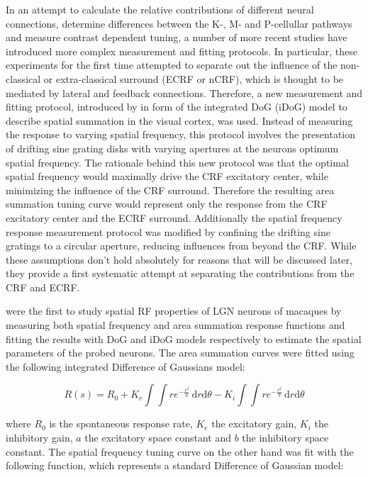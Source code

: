 In an attempt to calculate the relative contributions of different
neural connections, determine differences between the K-, M- and
P-cellullar pathways and measure contrast dependent tuning, a number
of more recent studies have introduced more complex measurement and
fitting protocols. In particular, these experiments for the first time
attempted to separate out the influence of the non-classical or
extra-classical surround (ECRF or nCRF), which is thought to be
mediated by lateral and feedback connections. Therefore, a new
measurement and fitting protocol, introduced by \cite{Sceniak1999} in
form of the integrated DoG (iDoG) model to describe spatial summation
in the visual cortex, was used. Instead of measuring the response to
varying spatial frequency, this protocol involves the presentation of
drifting sine grating disks with varying apertures at the neurons
optimum spatial frequency. The rationale behind this new protocol was
that the optimal spatial frequency would maximally drive the CRF
excitatory center, while minimizing the influence of the CRF
surround. Therefore the resulting area summation tuning curve would
represent only the response from the CRF excitatory center and the
ECRF surround. Additionally the spatial frequency response measurement
protocol was modified by confining the drifting sine gratings to a
circular aperture, reducing influences from beyond the CRF. While
these assumptions don't hold absolutely for reasons that will be
discussed later, they provide a first systematic attempt at separating
the contributions from the CRF and ECRF.

\cite{Sceniak2006} were the first to study spatial RF properties of
LGN neurons of macaques by measuring both spatial frequency and area
summation response functions and fitting the results with DoG and iDoG
models respectively to estimate the spatial parameters of the probed
neurons. The area summation curves were fitted using the following
integrated Difference of Gaussians model:

\begin{equation}
R(s) = R_0 + K_e \int \int re^{-\frac{r^2}{a}} \,
\mathrm{d}r\mathrm{d}\theta - K_i \int\int re^{-\frac{r^2}{b}} \,
\mathrm{d}r\mathrm{d}\theta
\label{iDoG}
\end{equation}

\noindent where $R_0$ is the spontaneous response rate, $K_e$ the
excitatory gain, $K_i$ the inhibitory gain, $a$ the excitatory space
constant and $b$ the inhibitory space constant. The spatial frequency
tuning curve on the other hand was fit with the following function,
which represents a standard Difference of Gaussian model:


